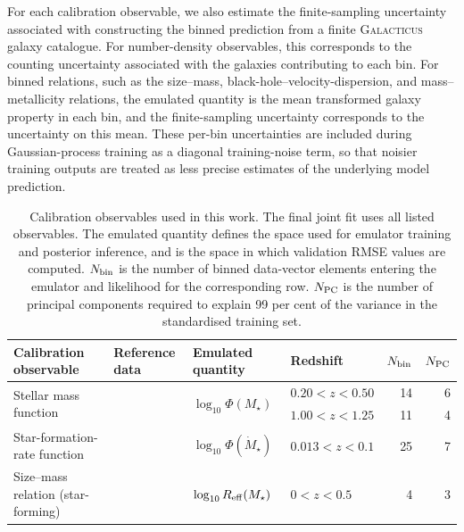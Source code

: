 \documentclass[twocolumn, apj, numberedappendix, iop]{openjournal}
\newcommand{\galacticus}{\textsc{Galacticus}\xspace}
\begin{document}
For each calibration observable, we also estimate the finite-sampling
uncertainty associated with constructing the binned prediction from a finite
\galacticus{} galaxy catalogue. For number-density observables, this corresponds
to the counting uncertainty associated with the galaxies contributing to each
bin. For binned relations, such as the size--mass,
black-hole--velocity-dispersion, and mass--metallicity relations, the emulated
quantity is the mean transformed galaxy property in each bin, and the
finite-sampling uncertainty corresponds to the uncertainty on this mean.
These per-bin uncertainties are included during Gaussian-process training as a
diagonal training-noise term, so that noisier training outputs are treated as
less precise estimates of the underlying model prediction.

\begin{table}
\centering
\caption{
Calibration observables used in this work.
The final joint fit uses all listed observables.
The emulated quantity defines the space used for emulator training and posterior
inference, and is the space in which validation RMSE values are computed.
\(N_{\rm bin}\) is the number of binned data-vector elements entering the
emulator and likelihood for the corresponding row.
\(N_{\rm PC}\) is the number of principal components required to explain
99 per cent of the variance in the standardised training set.
}
\label{tab:calibration-observable-summary}
\begin{tabular}{@{}p{}p{}p{}p{}rr@{}}
\toprule
Calibration observable
  & Reference data
  & Emulated quantity
  & Redshift
  & \(N_{\rm bin}\)
  & \(N_{\rm PC}\) \\
\midrule

\multirow{2}{0.28\textwidth}{Stellar mass function}
  & \multirow{2}{0.17\textwidth}{\citet{2014ApJ...783...85T}}
  & \multirow{2}{0.17\textwidth}{\(\log_{10}\Phi(M_\star)\)}
  & \(0.20<z<0.50\) & 14 & 6 \\
  & & & \(1.00<z<1.25\) & 11 & 4 \\
\addlinespace[0.5em]

Star-formation-rate function
  & \citet{2011MNRAS.416.2640R}
  & \(\log_{10}\Phi(\dot{M}_\star)\)
  & \(0.013<z<0.1\) & 25 & 7 \\
\addlinespace[0.5em]

Size--mass relation (star-forming)
  & \multirow{2}{0.17\textwidth}{\citet{2014ApJ...788...28V}}
  & \(\log_{10}R_{\rm eff}(M_\star)\)
  & \(0<z<0.5\) & 4 & 3 \\


\end{tabular}
\end{table}
\end{document}
